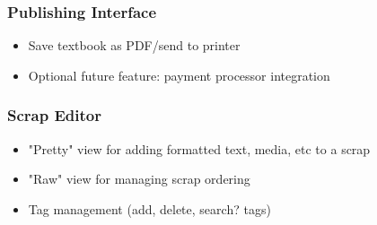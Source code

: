 \documentclass[onecolumn, draftclsnofoot,10pt, compsoc]{IEEEtran}
\begin{document}
{\subsubsection[System feature 5: Publishing Interface]{Publishing Interface}
\begin{itemize}
\item Save textbook as PDF/send to printer
\item Optional future feature: payment processor integration
\end{itemize}

\subsubsection[System feature 6: Scrap Editor]{Scrap Editor}
\begin{itemize}
\item "Pretty" view for adding formatted text, media, etc to a scrap
\item "Raw" view for managing scrap ordering
\item Tag management (add, delete, search? tags)
\end{itemize}

\bigskip


}
\end{document}
